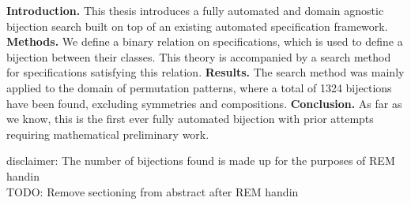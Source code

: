 \textbf{Introduction.} This thesis introduces a fully automated and domain agnostic bijection search built on top of an existing automated specification framework. \textbf{Methods.} We define a binary relation on specifications, which is used to define a bijection between their classes. This theory is accompanied by a search method for specifications satisfying this relation. \textbf{Results.} The search method was mainly applied to the domain of permutation patterns, where a total of 1324 bijections have been found, excluding symmetries and compositions. \textbf{Conclusion.} As far as we know, this is the first ever fully automated bijection with prior attempts requiring mathematical preliminary work.

\vspace{2cm}
{
\tiny
disclaimer: The number of bijections found is made up for the purposes of REM handin\\

TODO: Remove sectioning from abstract after REM handin
}